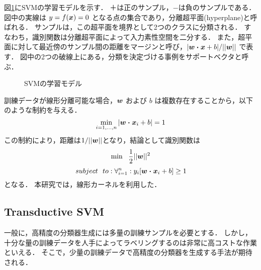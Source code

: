 図\ref{svm}にSVMの学習モデルを示す．
＋は正のサンプル，−は負のサンプルである．
図中の実線は $y = f(\mbox{\boldmath $x$}) = 0$ となる点の集合であり，分離超平面(hyperplane)と呼ばれる．
サンプルは，この超平面を境界として2つのクラスに分類される．
すなわち，識別関数は分離超平面によって入力素性空間を二分する．
また，超平面に対して最近傍のサンプル間の距離をマージンと呼び，$|\mbox{\boldmath $w \cdot x$}+b|/||\mbox{\boldmath $w$}||$ で表す．
図中の2つの破線上にある，分類を決定づける事例をサポートベクタと呼ぶ．

\begin{figure}
\begin{center}
\end{center}
\vspace{-3mm}
\caption{SVMの学習モデル}
\label{svm}
\end{figure}

訓練データが線形分離可能な場合，$\mbox{\boldmath $w$}$ および $b$ は複数存在することから，以下のような制約を与える．
\begin{equation}
\min_{i=1,\ldots,n} |{\mbox{\boldmath $w \cdot x$}}_{i}+b|=1 
\end{equation}
この制約により，距離は$1/||{\mbox{\boldmath $w$}}||$となり，結論として識別関数は
\begin{equation}
 \min~~\frac{1}{2}||{\mbox{\boldmath $w$}}||^{2} 
\end{equation}
\[subject~~to: \forall^{n}_{i=1}: y_{i}[{\mbox{\boldmath $w \cdot x$}}_{i}+b] \geq 1\]
となる．
本研究では，線形カーネルを利用した．

\subsection{Transductive SVM}
一般に，高精度の分類器生成には多量の訓練サンプルを必要とする．
しかし，十分な量の訓練データを人手によってラベリングするのは非常に高コストな作業といえる．
そこで，少量の訓練データで高精度の分類器を生成する手法が期待される．

